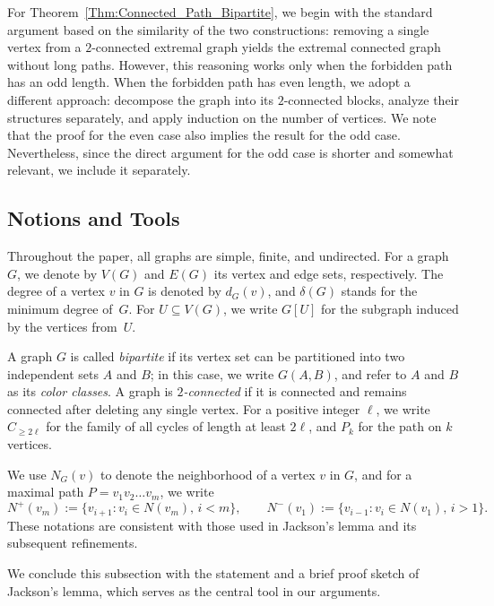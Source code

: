 \documentclass[11pt,a4paper]{article}
\begin{document}
For Theorem~\ref{Thm:Connected_Path_Bipartite}, we begin with the standard argument based on the similarity of the two constructions: removing a single vertex from a $2$-connected extremal graph yields the extremal connected graph without long paths.
However, this reasoning works only when the forbidden path has an odd length.
When the forbidden path has even length, we adopt a different approach: decompose the graph into its $2$-connected blocks, analyze their structures separately, and apply induction on the number of vertices.
We note that the proof for the even case also implies the result for the odd case.
Nevertheless, since the direct argument for the odd case is shorter and somewhat relevant, we include it separately.




\subsection{Notions and Tools}\label{Sub_Sec_Jack}


Throughout the paper, all graphs are simple, finite, and undirected.  
For a graph $G$, we denote by $V(G)$ and $E(G)$ its vertex and edge sets, respectively.  
The degree of a vertex $v$ in $G$ is denoted by $d_G(v)$, and $\delta(G)$ stands for the minimum degree of~$G$.  
For $U \subseteq V(G)$, we write $G[U]$ for the subgraph induced by the vertices from~$U$.  

A graph $G$ is called \emph{bipartite} if its vertex set can be partitioned into two independent sets $A$ and $B$; in this case, we write $G(A,B)$, and refer to $A$ and $B$ as its \emph{color classes}.  
A graph is \emph{$2$-connected} if it is connected and remains connected after deleting any single vertex.  
For a positive integer $\ell$, we write $C_{\ge 2\ell}$ for the family of all cycles of length at least $2\ell$, and $P_k$ for the path on $k$ vertices.  


We use $N_G(v)$ to denote the neighborhood of a vertex $v$ in $G$, and for a maximal path $P=v_1v_2\dots v_m$, we write  
\[
N^+(v_m) := \{v_{i+1} : v_i \in N(v_m),\, i < m\}, \qquad
N^-(v_1) := \{v_{i-1} : v_i \in N(v_1),\, i > 1\}.
\]
These notations are consistent with those used in Jackson’s lemma and its subsequent refinements.  


We conclude this subsection with the statement and a brief proof sketch of Jackson’s lemma, which serves as the central tool in our arguments.
\end{document}
